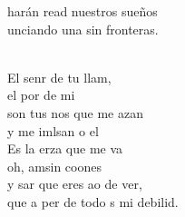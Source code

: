 \documentclass[12pt]{article}
\begin{document}
\begin{multicols*}{2}
\begin{cancion}
	harán read nuestros sueños\\
	unciando una sin fronteras.\\\jump\\
	\begin{chorus}%
	El senr de tu llam,\\
	el por de mi\\
	son tus nos que me azan\\
	y me imlsan o el \\
	Es la erza que me va\\
	oh,  amsin coones\\
	y sar que eres ao de ver,\\
	que a per de todo s mi debilid.\\
	\end{chorus}%
	\jump\\
\end{cancion}%


\end{multicols*}
\end{document}
